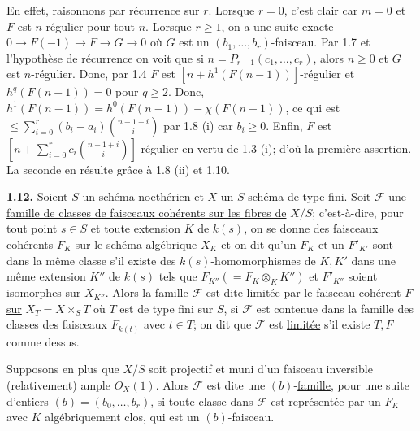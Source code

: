 
En
effet, raisonnons par récurrence sur \(r\). Lorsque \(r=0\), c'est clair car \(m=0\) et \(F\) est \(n\)-régulier pour tout \(n\). Lorsque \(r\ge1\), on a une suite exacte $0\longrightarrow F(-1)\longrightarrow F\longrightarrow G\longrightarrow0$ où \(G\) est un \((b_1,\ldots,b_r)\)-faisceau. Par 1.7 et l'hypothèse de récurrence on voit que si \(n=P_{r-1}(c_1,\ldots,c_r)\), alors \(n\ge0\) et \(G\) est \(n\)-régulier. Donc, par 1.4 \(F\) est \([n+h^1(F(n-1))]\)-régulier et \(h^q(F(n-1))=0\) pour \(q\ge2\). Donc, \(h^1(F(n-1))=h^0(F(n-1))-\chi(F(n-1))\), ce qui est \(\le \sum_{i=0}^{r}(b_i-a_i)\binom{n-1+i}{i}\) par 1.8 (i) car \(b_i\ge0\). Enfin, \(F\) est \(\left[n+\sum_{i=0}^{r}c_i\binom{n-1+i}{i}\right]\)-régulier en vertu de 1.3 (i); d'où la première assertion. La seconde en résulte grâce à 1.8 (ii) et 1.10.

\textbf{1.12.} Soient \(S\) un schéma noethérien et \(X\) un \(S\)-schéma de type fini. Soit \(\mathcal F\) une \uline{famille de classes de faisceaux cohérents sur les fibres de} \(X/S\); c'est-à-dire, pour tout point \(s\in S\) et toute extension \(K\) de \(k(s)\), on se donne des faisceaux cohérents \(F_K\) sur le schéma algébrique \(X_K\) et on dit qu'un \(F_K\) et un \(F'_{K'}\) sont dans la même classe s'il existe des \(k(s)\)-homomorphismes de \(K,K'\) dans une même extension \(K''\) de \(k(s)\) tels que \(F_{K''}(=F_K\otimes_K K'')\) et \(F'_{K''}\) soient isomorphes sur \(X_{K''}\). Alors la famille \(\mathcal F\) est dite \uline{limitée par le faisceau cohérent} \(F\) \uline{sur} \(X_T=X\times_S T\) où \(T\) est de type fini sur \(S\), si \(\mathcal F\) est contenue dans la famille des classes des faisceaux \(F_{k(t)}\) avec \(t\in T\); on dit que \(\mathcal F\) est \uline{limitée} s'il existe \(T,F\) comme dessus.

Supposons en plus que \(X/S\) soit projectif et muni d'un faisceau inversible (relativement) ample \({O}_X(1)\). Alors \(\mathcal F\) est dite une \((b)\)-\uline{famille}, pour une suite d'entiers \((b)=(b_0,\ldots,b_r)\), si toute classe dans \(\mathcal F\) est représentée par un \(F_K\) avec \(K\) algébriquement clos, qui est un \((b)\)-faisceau.

